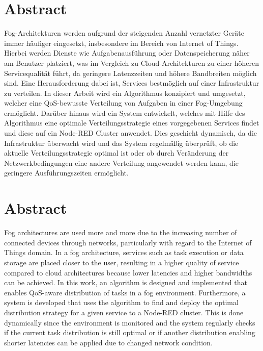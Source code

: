 \newpage

\section*{Abstract}

Fog-Architekturen werden aufgrund der steigenden Anzahl vernetzter Geräte immer häufiger eingesetzt, insbesondere im Bereich von Internet of Things.
Hierbei werden Dienste wie Aufgabenausführung oder Datenspeicherung näher am Benutzer platziert, was im Vergleich zu Cloud-Architekturen zu einer höheren Servicequalität führt, da geringere Latenzzeiten und höhere Bandbreiten möglich sind.
Eine Herausforderung dabei ist, Services bestmöglich auf einer Infrastruktur zu verteilen.
In dieser Arbeit wird ein Algorithmus konzipiert und umgesetzt, welcher eine QoS-bewusste Verteilung von Aufgaben in einer Fog-Umgebung ermöglicht.
Darüber hinaus wird ein System entwickelt, welches mit Hilfe des Algorithmus eine optimale Verteilungsstrategie eines vorgegebenen Services findet und diese auf ein Node-RED Cluster anwendet.
Dies geschieht dynamisch, da die Infrastruktur überwacht wird und das System regelmäßig überprüft, ob die aktuelle Verteilungsstrategie optimal ist oder ob durch Veränderung der Netzwerkbedingungen eine andere Verteilung angewendet werden kann, die geringere Ausführungszeiten ermöglicht.


\section*{Abstract}

Fog architectures are used more and more due to the increasing number of connected devices through networks, particularly with regard to the Internet of Things domain.
In a fog architecture, services such as task execution or data storage are placed closer to the user, resulting in a higher quality of service compared to cloud architectures because lower latencies and higher bandwidths can be achieved.
In this work, an algorithm is designed and implemented that enables QoS-aware distribution of tasks in a fog environment.
Furthermore, a system is developed that uses the algorithm to find and deploy the optimal distribution strategy for a given service to a Node-RED cluster.
This is done dynamically since the environment is monitored and the system regularly checks if the current task distribution is still optimal or if another distribution enabling shorter latencies can be applied due to changed network condition.
